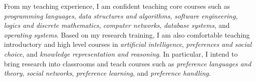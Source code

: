 \documentclass[12pt]{article}
\newcommand{\tit}[1]{\textit{#1}}
\begin{document}
From my teaching experience, I am confident teaching core courses such as
\tit{programming languages}, \tit{data structures and algorithms}, \tit{software engineering},
\tit{logics and discrete mathematics},
\tit{computer networks}, \tit{database systems}, and \tit{operating systems}.
Based on my research training, I am also comfortable teaching introductory and high 
level courses in \tit{artificial intelligence},
\tit{preferences and social choice}, and \tit{knowledge representation and reasoning}.
In particular, I intend to bring research into classrooms and teach courses such as
\tit{preference languages and theory}, \tit{social networks},
\tit{preference learning}, and \tit{preference handling}.
\end{document}
